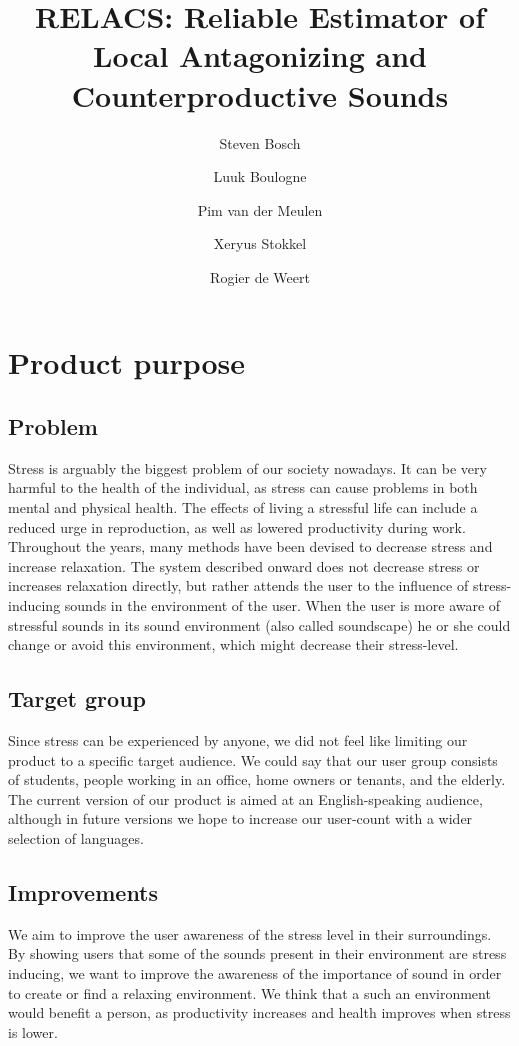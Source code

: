 \documentclass[a4paper]{article}
\title{{RELACS: Reliable Estimator of Local Antagonizing and Counterproductive Sounds}}
\author{Steven Bosch \and Luuk Boulogne \and Pim van der Meulen \and Xeryus Stokkel  \and Rogier de Weert}
\begin{document}
\maketitle

\section{Product purpose}

\subsection{Problem}
Stress is arguably the biggest problem of our society nowadays.
It can be very harmful to the health of the individual, as stress can cause problems in both mental and physical health.
The effects of living a stressful life can include a reduced urge in reproduction, as well as lowered productivity during work.
Throughout the years, many methods have been devised to decrease stress and increase relaxation.
The system described onward does not decrease stress or increases relaxation directly, but rather attends the user to the influence of stress-inducing sounds in the environment of the user.
When the user is more aware of stressful sounds in its sound environment (also called soundscape) he or she could change or avoid this environment, which might decrease their stress-level.

\subsection{Target group}
Since stress can be experienced by anyone, we did not feel like limiting our product to a specific target audience.
We could say that our user group consists of students, people working in an office, home owners or tenants, and the elderly. 
The current version of our product is aimed at an English-speaking audience, although in future versions we hope to increase our user-count with a wider selection of languages. 

\subsection{Improvements}
We aim to improve the user awareness of the stress level in their surroundings.
By showing users that some of the sounds present in their environment are stress inducing, we want to improve the awareness of the importance of sound in order to create or find a relaxing environment. 
We think that a such an environment would benefit a person, as productivity increases and health improves when stress is lower.
\end{document}
